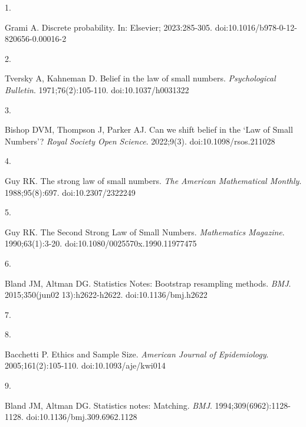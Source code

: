 \documentclass[
  a4paper,
]{book}
\newlength{\cslhangindent}
\newlength{\csllabelwidth}
\newlength{\cslentryspacingunit} %
\newenvironment{CSLReferences}[2] %
 {%
  \setlength{\parindent}{0pt}
  \ifodd #1
  \let\oldpar\par
  \def\par{\hangindent=\cslhangindent\oldpar}
  \fi
  \setlength{\parskip}{#2\cslentryspacingunit}
 }%
 {}
\newcommand{\CSLLeftMargin}[1]{\parbox[t]{\csllabelwidth}{#1}}
\newcommand{\CSLRightInline}[1]{\parbox[t]{\linewidth - \csllabelwidth}{#1}\break}
\renewcommand{\href}[2]{#2\footnote{\url{#1}}}
\newcommand{\DisableFootNotes}{%
  \renewcommand{\footnote}[2][]{\relax}
}
\begin{document}
\DisableFootNotes

\hypertarget{refs}{}
\begin{CSLReferences}{0}{0}
\leavevmode{}%
\CSLLeftMargin{1. }%
\CSLRightInline{Grami A. Discrete probability. In: Elsevier; 2023:285-305. doi:\href{https://doi.org/10.1016/b978-0-12-820656-0.00016-2}{10.1016/b978-0-12-820656-0.00016-2}}

\leavevmode{}%
\CSLLeftMargin{2. }%
\CSLRightInline{Tversky A, Kahneman D. Belief in the law of small numbers. \emph{Psychological Bulletin}. 1971;76(2):105-110. doi:\href{https://doi.org/10.1037/h0031322}{10.1037/h0031322}}

\leavevmode{}%
\CSLLeftMargin{3. }%
\CSLRightInline{Bishop DVM, Thompson J, Parker AJ. Can we shift belief in the {`}Law of Small Numbers{'}? \emph{Royal Society Open Science}. 2022;9(3). doi:\href{https://doi.org/10.1098/rsos.211028}{10.1098/rsos.211028}}

\leavevmode{}%
\CSLLeftMargin{4. }%
\CSLRightInline{Guy RK. The strong law of small numbers. \emph{The American Mathematical Monthly}. 1988;95(8):697. doi:\href{https://doi.org/10.2307/2322249}{10.2307/2322249}}

\leavevmode{}%
\CSLLeftMargin{5. }%
\CSLRightInline{Guy RK. The Second Strong Law of Small Numbers. \emph{Mathematics Magazine}. 1990;63(1):3-20. doi:\href{https://doi.org/10.1080/0025570x.1990.11977475}{10.1080/0025570x.1990.11977475}}

\leavevmode{}%
\CSLLeftMargin{6. }%
\CSLRightInline{Bland JM, Altman DG. Statistics Notes: Bootstrap resampling methods. \emph{BMJ}. 2015;350(jun02 13):h2622-h2622. doi:\href{https://doi.org/10.1136/bmj.h2622}{10.1136/bmj.h2622}}

\leavevmode{}%
\CSLLeftMargin{7. }

\leavevmode{}%
\CSLLeftMargin{8. }%
\CSLRightInline{Bacchetti P. Ethics and Sample Size. \emph{American Journal of Epidemiology}. 2005;161(2):105-110. doi:\href{https://doi.org/10.1093/aje/kwi014}{10.1093/aje/kwi014}}

\leavevmode{}%
\CSLLeftMargin{9. }%
\CSLRightInline{Bland JM, Altman DG. Statistics notes: Matching. \emph{BMJ}. 1994;309(6962):1128-1128. doi:\href{https://doi.org/10.1136/bmj.309.6962.1128}{10.1136/bmj.309.6962.1128}}


\end{CSLReferences}
\end{document}
